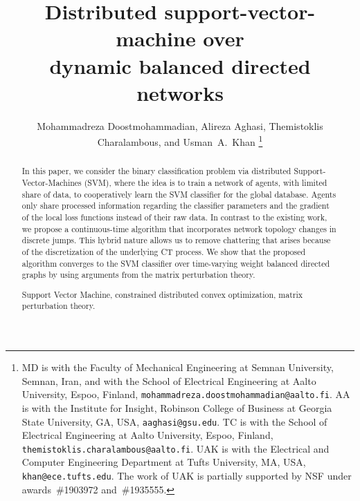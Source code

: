 \documentclass[letterpaper, 10pt, conference]{ieeeconf}
\begin{document}
\title{\huge \bf Distributed support-vector-machine over \\ dynamic balanced directed networks}
\author{Mohammadreza Doostmohammadian, Alireza Aghasi,  Themistoklis Charalambous, and  Usman~A.~Khan
\thanks{MD is with the Faculty of Mechanical Engineering at Semnan University, Semnan, Iran, and with the School of Electrical Engineering at Aalto University, Espoo, Finland, \texttt{mohammadreza.doostmohammadian@aalto.fi}. AA is with the Institute for Insight,  Robinson College of Business at Georgia State University, GA, USA, \texttt{aaghasi@gsu.edu}. TC is with the School of Electrical Engineering at Aalto University,
Espoo, Finland, \texttt{themistoklis.charalambous@aalto.fi}. UAK is with the Electrical and Computer Engineering Department at Tufts University, MA, USA, \texttt{khan@ece.tufts.edu}. The work of UAK is partially supported by NSF under awards~\#1903972 and~\#1935555.}}
\maketitle

\begin{abstract}
	In this paper, we consider the binary classification problem via distributed Support-Vector-Machines (SVM), where the idea is to train a network of agents, with limited share of data, to cooperatively learn the SVM classifier for the global database. Agents only share processed information regarding the classifier parameters and the gradient of the local loss functions instead of their raw data. In contrast to the existing work, we propose a continuous-time algorithm that incorporates network topology changes in discrete jumps. This hybrid nature allows us to remove chattering that arises because of the discretization of the underlying CT process. We show that the proposed algorithm converges to the SVM classifier over time-varying weight balanced directed graphs by using  arguments from the matrix perturbation theory. 
	
\keywords Support Vector Machine, constrained distributed convex optimization, matrix perturbation theory.
\end{abstract}
\end{document}
